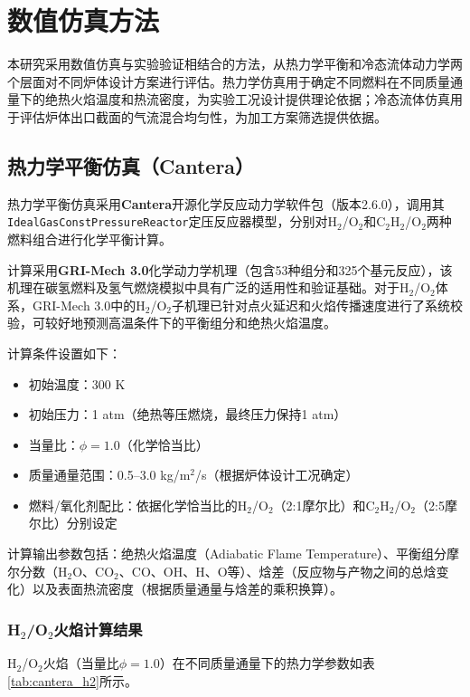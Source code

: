 \section{数值仿真方法}

本研究采用数值仿真与实验验证相结合的方法，从热力学平衡和冷态流体动力学两个层面对不同炉体设计方案进行评估。热力学仿真用于确定不同燃料在不同质量通量下的绝热火焰温度和热流密度，为实验工况设计提供理论依据；冷态流体仿真用于评估炉体出口截面的气流混合均匀性，为加工方案筛选提供依据。

\subsection{热力学平衡仿真（Cantera）}

热力学平衡仿真采用\textbf{Cantera}开源化学反应动力学软件包（版本2.6.0），调用其\texttt{IdealGasConstPressureReactor}定压反应器模型，分别对H$_2$/O$_2$和C$_2$H$_2$/O$_2$两种燃料组合进行化学平衡计算。

计算采用\textbf{GRI-Mech 3.0}化学动力学机理（包含53种组分和325个基元反应），该机理在碳氢燃料及氢气燃烧模拟中具有广泛的适用性和验证基础。对于H$_2$/O$_2$体系，GRI-Mech 3.0中的H$_2$/O$_2$子机理已针对点火延迟和火焰传播速度进行了系统校验，可较好地预测高温条件下的平衡组分和绝热火焰温度。

计算条件设置如下：

\begin{itemize}
	\item 初始温度：300 K
	\item 初始压力：1 atm（绝热等压燃烧，最终压力保持1 atm）
	\item 当量比：$\phi = 1.0$（化学恰当比）
	\item 质量通量范围：0.5--3.0 kg/m$^2$/s（根据炉体设计工况确定）
	\item 燃料/氧化剂配比：依据化学恰当比的H$_2$/O$_2$（2:1摩尔比）和C$_2$H$_2$/O$_2$（2:5摩尔比）分别设定
\end{itemize}

计算输出参数包括：绝热火焰温度（Adiabatic Flame Temperature）、平衡组分摩尔分数（H$_2$O、CO$_2$、CO、OH、H、O等）、焓差（反应物与产物之间的总焓变化）以及表面热流密度（根据质量通量与焓差的乘积换算）。

\subsubsection{H$_2$/O$_2$火焰计算结果}

H$_2$/O$_2$火焰（当量比$\phi=1.0$）在不同质量通量下的热力学参数如表\ref{tab:cantera_h2}所示。

